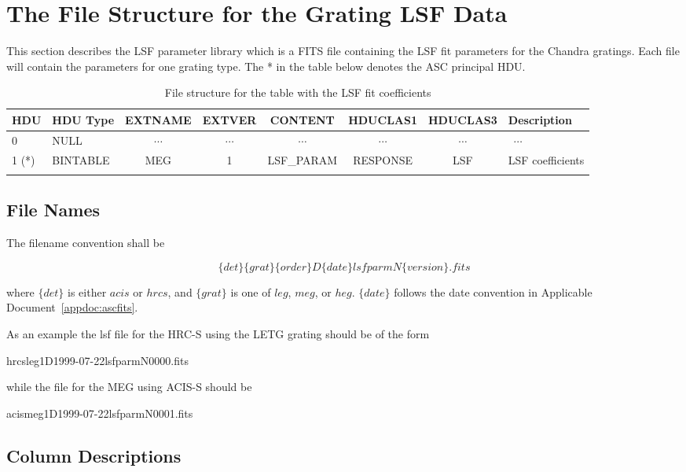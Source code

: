 \documentclass[twoside]{article}
\def\nodata{ ~$\cdots$~ }
\begin{document}

\clearpage

\section{The File Structure for the Grating LSF Data}

This section describes the LSF parameter library which is a FITS file
containing the LSF fit parameters for the Chandra gratings. Each file
will contain the parameters for one grating type.
The * in the table below  denotes the ASC principal HDU.

\begin{table}[h]
{\footnotesize
\noindent\begin{tabular}{|llcccccp{1.2in}|}\hline
HDU
& \sc HDU Type
& \sc EXTNAME
& \sc EXTVER
& \sc CONTENT
& \sc HDUCLAS1
& \sc HDUCLAS3
& Description
\\
\hline
%
0 
& \sc NULL
& \nodata
& \nodata
& \nodata
& \nodata
& \nodata
& \nodata
\\
%
1 (*)
& \sc BINTABLE
& \sc MEG
& 1
& \sc LSF\_PARAM
& RESPONSE
& \sc LSF
& LSF coefficients
\\
%
\\\hline
%
\end{tabular}
}%
\caption{File structure for the table with the LSF fit coefficients}
\label{tab:fstruct}
\end{table}
%

\subsection{File Names}

The filename convention shall be

$$\{ det\} \{grat\}\{order\}D \{date\} lsfparmN\{version\}.fits$$

where $\{det\}$ is either $acis$ or $hrcs$, and $\{grat\}$ is one of $leg$, $meg$,
or $heg$. $\{date\}$ follows the date convention in Applicable
Document~\ref{appdoc:ascfits}. 

As an example the lsf file for the HRC-S using the LETG grating should 
be of the form 

hrcsleg1D1999-07-22lsfparmN0000.fits

while the file for the MEG using ACIS-S should be 

acismeg1D1999-07-22lsfparmN0001.fits

\subsection{Column Descriptions}
\end{document}
